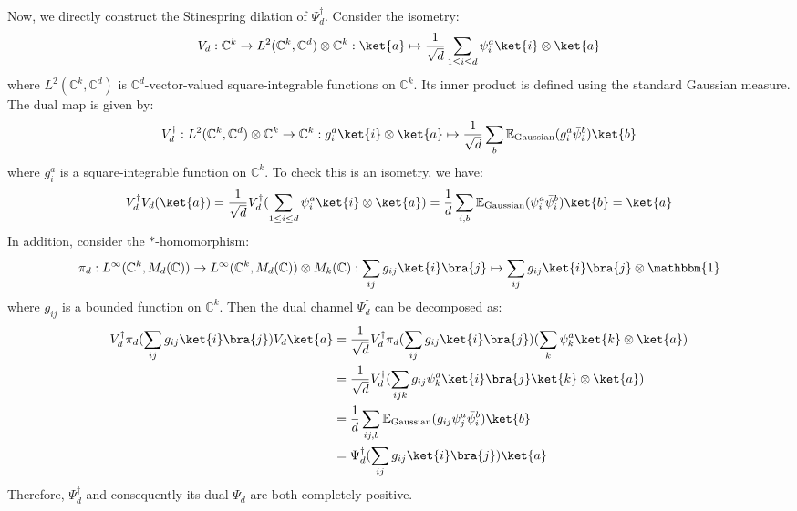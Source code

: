 \documentclass[a4paper,11pt]{article}
\theoremstyle{definition}
\numberwithin{equation}{section}
\begin{document}
Now, we directly construct the Stinespring dilation of $\Psi^\dagger_d$. Consider the isometry:
\begin{equation}
    V_d:\mathbb{C}^k\rightarrow L^2(\mathbb{C}^k, \mathbb{C}^d)\otimes\mathbb{C}^k:\ket{a}\mapsto\frac{1}{\sqrt{d}}\sum_{1\leq i\leq d}{\psi}^a_i\ket{i}\otimes\ket{a}
\end{equation}
where $L^2(\mathbb{C}^k,\mathbb{C}^d)$ is $\mathbb{C}^d$-vector-valued square-integrable functions on $\mathbb{C}^k$. Its inner product is defined using the standard Gaussian measure. The dual map is given by:
\begin{equation}
    V^\dagger_d:L^2(\mathbb{C}^k,\mathbb{C}^d)\otimes\mathbb{C}^k\rightarrow\mathbb{C}^k: g^a_i\ket{i}\otimes\ket{a}\mapsto\frac{1}{\sqrt{d}}\sum_{b}\mathbb{E}_\text{Gaussian}(g^a_i\bar{\psi}^b_i)\ket{b}
\end{equation}
where $g^a_i$ is a square-integrable function on $\mathbb{C}^k$. To check this is an isometry, we have:
\begin{equation}
    V^\dagger_dV_d(\ket{a}) = \frac{1}{\sqrt{d}}V^\dagger_d(\sum_{1\leq i\leq d}{\psi}^a_i\ket{i}\otimes\ket{a}) = \frac{1}{d}\sum_{i,b}\mathbb{E}_\text{Gaussian}({\psi}^a_i\bar{\psi}^b_i)\ket{b} = \ket{a}
\end{equation}
In addition, consider the $*$-homomorphism:
\begin{equation}
    \pi_d: L^\infty(\mathbb{C}^k,M_d(\mathbb{C}))\rightarrow L^\infty(\mathbb{C}^k, M_d(\mathbb{C}))\otimes M_k(\mathbb{C}):\sum_{ij}g_{ij}\ket{i}\bra{j}\mapsto\sum_{ij}g_{ij}\ket{i}\bra{j}\otimes\mathbbm{1}
\end{equation}
where $g_{ij}$ is a bounded function on $\mathbb{C}^k$. Then the dual channel $\Psi^\dagger_d$ can be decomposed as:
\begin{align}
    \begin{split}
        V^\dagger_d\pi_d(\sum_{ij}g_{ij}\ket{i}\bra{j})V_d\ket{a} &= \frac{1}{\sqrt{d}}V^\dagger_d\pi_d(\sum_{ij}g_{ij}\ket{i}\bra{j})(\sum_k{\psi}^a_k\ket{k}\otimes\ket{a}) \\&= \frac{1}{\sqrt{d}}V^\dagger_d(\sum_{ijk}g_{ij}{\psi}^a_k\ket{i}\bra{j}\ket{k}\otimes\ket{a})
        \\&=\frac{1}{d}\sum_{ij,b}\mathbb{E}_\text{Gaussian}(g_{ij}{\psi}^a_j\bar{\psi}^b_i)\ket{b}
        \\&
        = \Psi^\dagger_d(\sum_{ij}g_{ij}\ket{i}\bra{j})\ket{a}
    \end{split}
\end{align}
Therefore, $\Psi^\dagger_d$ and consequently its dual $\Psi_d$ are both completely positive.
\end{document}
